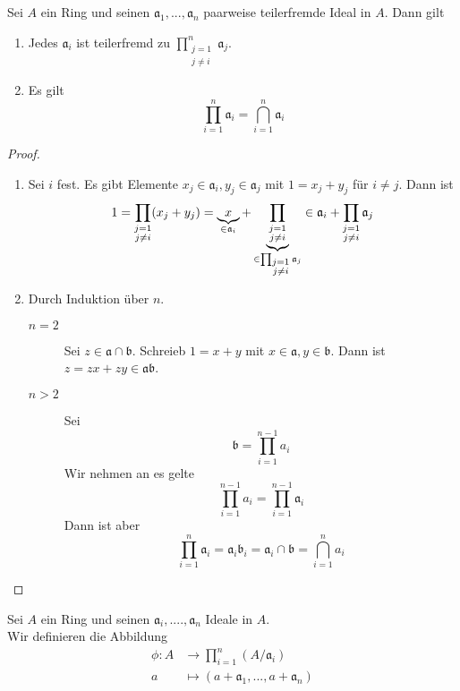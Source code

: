 	\begin{satz}
		Sei $A$ ein Ring und seinen $\mathfrak a_1,...,\mathfrak a_n$ paarweise teilerfremde Ideal in $A$. Dann gilt
		\begin{enumerate}
			\item Jedes $\mathfrak a_i$ ist teilerfremd zu $\prod_{\substack{j=1\\j\neq i}}^{n}\mathfrak a_j$.
			\item Es gilt
			\[\prod_{i=1}^{n}\mathfrak a_i=\bigcap_{i=1}^n \mathfrak a_i\]
		\end{enumerate}
	\end{satz}
	\begin{proof}
		\begin{enumerate}
			\item Sei $i$ fest. Es gibt Elemente $x_j\in \mathfrak a_i, y_j\in\mathfrak a_j$ mit $1=x_j+y_j$ für $i\neq j$. Dann ist
			\[
			1=\prod_{\substack{j=1\\j\neq i}}(x_j+y_j)
			=\underbrace{x}_{\mathclap{\in\mathfrak a_i}}+\underbrace{\prod_{\substack{j=1\\j\neq i}}}_{\in \prod_{\substack{j=1\\j\neq i}}\mathfrak a_j}
			\in\mathfrak a_i+\prod_{\substack{j=1\\j\neq i}}\mathfrak a_j
			\]
			\item Durch Induktion über $n$.
			\begin{description}
				\item[$n=2$] Sei $z\in\mathfrak a\cap\mathfrak b$. Schreieb $1=x+y$ mit $x\in\mathfrak a,y\in\mathfrak b$. Dann ist $z=zx+zy\in\mathfrak a\mathfrak b$.
				\item[$n>2$] Sei 
				\[\mathfrak b=\prod_{i=1}^{n-1}a_i\]
				Wir nehmen an es gelte
				\[\prod_{i=1}^{n-1}a_i=\prod_{i=1}^{n-1}\mathfrak a_i\]
				Dann ist aber
				\[\prod_{i=1}^n \mathfrak a_i=\mathfrak a_i\mathfrak b_i=\mathfrak a_i\cap\mathfrak b=\bigcap_{i=1}^n a_i\]
			\end{description}
		\end{enumerate}
	\end{proof}

	\begin{definition}
		Sei $A$ ein Ring und seinen $\mathfrak a_i,....,\mathfrak a_n$ Ideale in $A$.\\
		Wir definieren die Abbildung 
		\begin{align*}
		\phi:A&\to\prod_{i=1}^n(A/\mathfrak a_i)\\
		a&\mapsto(a+\mathfrak a_1,...,a+\mathfrak a_n)
		\end{align*}
	\end{definition}

